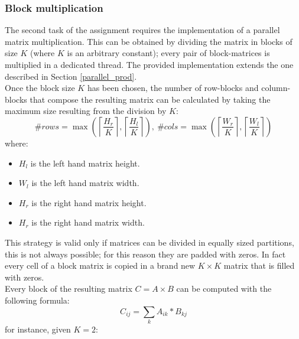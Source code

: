 \documentclass[10pt,a4paper]{article}
\begin{document}


\subsubsection{Block multiplication}\label{block_structure}
The second task of the assignment requires the implementation of a parallel
matrix multiplication. This can be obtained by dividing the matrix in blocks
of size $K$ (where $K$ is an arbitrary constant); every pair of block-matrices is
multiplied in a dedicated thread. The provided implementation extends the one
described in Section \ref{parallel_prod}.\\ Once the block size $K$ has been
chosen, the number of row-blocks and column-blocks that compose the resulting
matrix can be calculated by taking the maximum size resulting from the division
by $K$:
\[
    \#\textit{rows}=\max\left(\left\lceil \frac{H_r}{K}\right\rceil, \left\lceil \frac{H_l}{K}\right\rceil \right),~\#\textit{cols}=\max\left(\left\lceil \frac{W_r}{K}\right\rceil, \left\lceil \frac{W_l}{K}\right\rceil \right)
\]
where: 
\begin{itemize}
    \item $H_l$ is the left hand matrix height.
    \item $W_l$ is the left hand matrix width.
    \item $H_r$ is the right hand matrix height.
    \item $H_r$ is the right hand matrix width.
\end{itemize}
This strategy is valid only if matrices can be divided in equally sized partitions,
this is not always possible; for this reason they are padded with zeros.  In fact
every cell of a block matrix is copied in a brand new $K\times K$ matrix that is
filled with zeros.\\ Every block of the resulting matrix $C=A\times B$ can be
computed with the following formula:
\[
    C_{ij}=\sum_k A_{ik}*B_{kj}
\]
for instance, given $K=2$:

\end{document}
